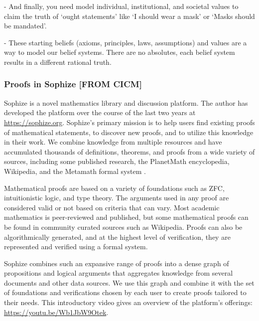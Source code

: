 \documentclass[a4paper]{article}
\begin{document}
- And finally, you need model individual, institutional, and societal values to claim the truth of `ought statements' like `I should wear a mask' or `Masks should be mandated'.

- These starting beliefs (axioms, principles, laws, assumptions) and values are a way to model our belief systems. There are no absolutes, each belief system results in a different rational truth.



\subsubsection*{Proofs in Sophize  [FROM CICM]}
Sophize is a novel mathematics library and discussion platform. The author has developed the platform over the course of the last two years at \url{https://sophize.org}. Sophize's primary mission is to help users find existing proofs of mathematical statements, to discover new proofs, and to utilize this knowledge in their work. We combine knowledge from multiple resources and have accumulated thousands of definitions, theorems, and proofs from a wide variety of sources, including some published research, the PlanetMath encyclopedia, Wikipedia, and the Metamath formal system \cite{metamath}.


Mathematical proofs are based on a variety of foundations such as ZFC, intuitionistic logic, and type theory. The arguments used in any proof are considered valid or not based on criteria that can vary. Most academic mathematics is peer-reviewed and published, but some mathematical proofs can be found in community curated sources such as Wikipedia. Proofs can also be algorithmically generated, and at the highest level of verification, they are represented and verified using a formal system. 

Sophize combines such an expansive range of proofs into a dense graph of propositions and logical arguments that aggregates knowledge from several documents and other data sources. We use this graph and combine it with the set of foundations and verifications chosen by each user to create proofs tailored to their needs. This introductory video gives an overview of the platform's offerings: \url{https://youtu.be/Wb1JbW9Otek}.
\end{document}
